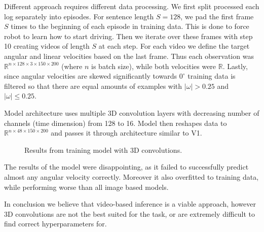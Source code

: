 \documentclass{article}
\begin{document}
Different approach requires different data processing. We first split processed each log separately into episodes. For sentence length $S = 128$, we pad the first frame $S$ times to the beginning of each episode in training data. This is done to force robot to learn how to start driving. Then we iterate over these frames with step 10 creating videos of length $S$ at each step. For each video we define the target angular and linear velocities based on the last frame. Thus each observation was $\mathbb{R}^{n \times 128 \times 3 \times 150 \times 200}$ (where $n$ is batch size), while both velocities were $\mathbb{R}$. Lastly, since angular velocities are skewed significantly towards $0^\circ$ training data is filtered so that there are equal amounts of examples with $|\omega| > 0.25$ and $|\omega| \le 0.25$.

Model architecture uses multiple 3D convolution layers with decreasing number of channels (time dimension) from 128 to 16. Model then reshapes data to $\mathbb{R}^{n \times 48 \times 150 \times 200}$ and passes it through architecture similar to V1.

\begin{figure}
\centering
    \qquad
    \caption{Results from training model with 3D convolutions.}
    \label{fig:data_examples}
\end{figure}

The results of the model were disappointing, as it failed to successfully predict almost any angular velocity correctly. Moreover it also overfitted to training data, while performing worse than all image based models.

In conclusion we believe that video-based inference is a viable approach, however 3D convolutions are not the best suited for the task, or are extremely difficult to find correct hyperparameters for.


\end{document}
